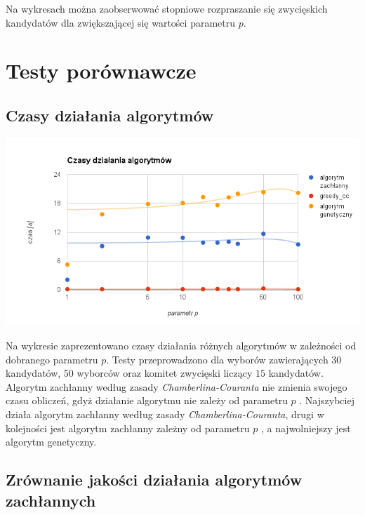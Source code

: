 \documentclass[polish,11pt]{aghthesis}
\begin{document}
\noindent Na wykresach można zaobserwować stopniowe rozpraszanie się zwycięskich kandydatów
dla zwiększającej się wartości parametru $p$.

\section{Testy porównawcze}
\subsection{Czasy działania algorytmów}
\begin{center}
\centerline{\includegraphics[scale=0.65]{pics/czas_dzialania.png}}
\end{center}
Na wykresie zaprezentowano czasy działania różnych algorytmów w zależności od
dobranego parametru $p$. Testy przeprowadzono dla wyborów zawierających $30$
kandydatów, $50$ wyborców oraz komitet zwycięski liczący $15$ kandydatów. Algorytm
zachłanny według zasady \textit{Chamberlina-Couranta} nie zmienia swojego czasu obliczeń, gdyż działanie
algorytmu nie zależy od parametru $p$ . Najszybciej działa algorytm zachłanny według zasady
\textit{Chamberlina-Couranta}, drugi w kolejności jest algorytm zachłanny zależny od parametru $p$ , a najwolniejszy jest algorytm genetyczny.

\subsection{Zrównanie jakości działania algorytmów zachłannych}
\end{document}
